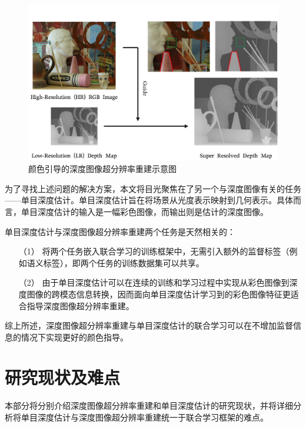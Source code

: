 \begin{figure}[!htbp]
\vspace{-0.8cm}  %
	\centering
	\includegraphics[scale=0.14]{figures/1}
	\caption{颜色引导的深度图像超分辨率重建示意图}
	\label{fig:1-1}
	\vspace{-0.8cm}  %
\end{figure}

为了寻找上述问题的解决方案，本文将目光聚焦在了另一个与深度图像有关的任务——单目深度估计。单目深度估计旨在将场景从光度表示映射到几何表示。具体而言，单目深度估计的输入是一幅彩色图像，而输出则是估计的深度图像。

单目深度估计与深度图像超分辨率重建两个任务是天然相关的：
\begin{enumerate}
	\item[（1）]	将两个任务嵌入联合学习的训练框架中，无需引入额外的监督标签（例如语义标签），即两个任务的训练数据集可以共享。
	\item[（2）] 由于单目深度估计可以在连续的训练和学习过程中实现从彩色图像到深度图像的跨模态信息转换，因而面向单目深度估计学习到的彩色图像特征更适合指导深度图像超分辨率重建。
\end{enumerate}

综上所述，深度图像超分辨率重建与单目深度估计的联合学习可以在不增加监督信息的情况下实现更好的颜色指导。

\section{研究现状及难点}

本部分将分别介绍深度图像超分辨率重建和单目深度估计的研究现状，并将详细分析将单目深度估计与深度图像超分辨率重建统一于联合学习框架的难点。

